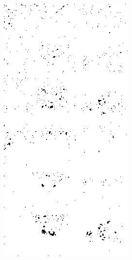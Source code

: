 \begin{figure}[H]
\begin{minipage}[t]{0.245\textwidth}
    \label{fig:noise_20_20}
    \includegraphics[width = \textwidth]{result/noisy/1_20_12.png}
    \label{fig:noise_20_12}
    \includegraphics[width = \textwidth]{result/noisy/1_20_6.png}

\end{minipage}
\end{figure}
